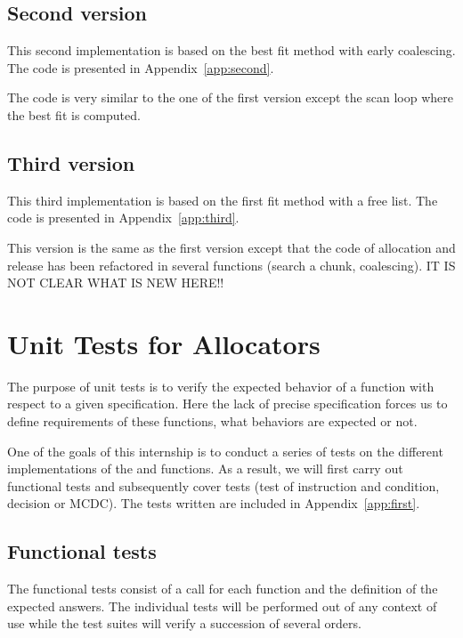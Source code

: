 \subsection{Second version}
This second implementation is based on the best fit method with early coalescing. 
The code is presented in Appendix~\ref{app:second}.

The code is very similar to the one of the first version except the scan loop where the best fit is computed.


\subsection{Third version}
This third implementation is based on the first fit method with a free list. 
The code is presented in Appendix~\ref{app:third}.

This version is the same as the first version except that the code of allocation and release has been refactored in several functions (search a chunk, coalescing).
IT IS NOT CLEAR WHAT IS NEW HERE!!



\section{Unit Tests for Allocators}
\label{sec:test}
The purpose of unit tests is to verify the expected behavior of a function with respect to a given specification. Here the lack of precise specification forces us to define requirements of these functions, what behaviors are expected or not.

One of the goals of this internship is to conduct a series of tests on the different implementations of the  and  functions. As a result, we will first carry out functional tests and subsequently cover tests (test of instruction and condition, decision or MCDC).
The tests written are included in Appendix~\ref{app:first}.

\subsection{Functional tests}

The functional tests consist of a call for each function and the definition of the expected answers. The individual tests will be performed out of any context of use while the test suites will verify a succession of several orders.

